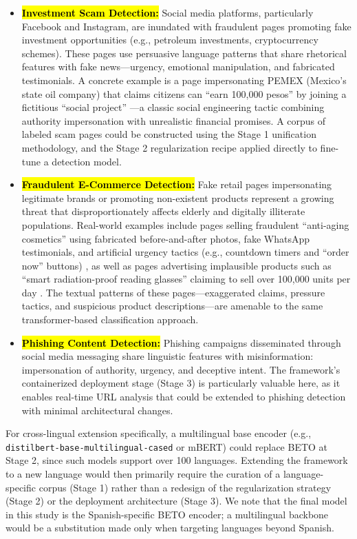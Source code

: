 \documentclass[informatics,article,accept,pdftex,moreauthors]{Definitions/mdpi}
\begin{document}
\begin{itemize}
    \item \textbf{\hl{Investment Scam Detection:}} Social media platforms, particularly Facebook and Instagram, are inundated with fraudulent pages promoting fake investment opportunities (e.g., petroleum investments, cryptocurrency schemes). These pages use persuasive language patterns that share rhetorical features with fake news—urgency, emotional manipulation, and fabricated testimonials. A concrete example is a page impersonating PEMEX (Mexico's state oil company) that claims citizens can ``earn 100,000 pesos'' by joining a fictitious ``social project'' \citep{scam2025investment}—a classic social engineering tactic combining authority impersonation with unrealistic financial promises. A corpus of labeled scam pages could be constructed using the Stage 1 unification methodology, and the Stage 2 regularization recipe applied directly to fine-tune a detection model.
    \item \textbf{\hl{Fraudulent E-Commerce Detection:}} Fake retail pages impersonating legitimate brands or promoting non-existent products represent a growing threat that disproportionately affects elderly and digitally illiterate populations. Real-world examples include pages selling fraudulent ``anti-aging cosmetics'' using fabricated before-and-after photos, fake WhatsApp testimonials, and artificial urgency tactics (e.g., countdown timers and ``order now'' buttons) \citep{scam2025cosmetics}, as well as pages advertising implausible products such as ``smart radiation-proof reading glasses'' claiming to sell over 100,000 units per day \citep{scam2025ecommerce}. The textual patterns of these pages—exaggerated claims, pressure tactics, and suspicious product descriptions—are amenable to the same transformer-based classification approach.
    \item \textbf{\hl{Phishing Content Detection:}} Phishing campaigns disseminated through social media messaging share linguistic features with misinformation: impersonation of authority, urgency, and deceptive intent. The framework's containerized deployment stage (Stage 3) is particularly valuable here, as it enables real-time URL analysis that could be extended to phishing detection with minimal architectural changes.
\end{itemize}

For cross-lingual extension specifically, a multilingual base encoder (e.g., \texttt{distilbert\allowbreak-base\allowbreak-multilingual\allowbreak-cased} or mBERT) could replace BETO at Stage 2, since such models support over 100 languages. Extending the framework to a new language would then primarily require the curation of a language-specific corpus (Stage 1) rather than a redesign of the regularization strategy (Stage 2) or the deployment architecture (Stage 3). We note that the final model in this study is the Spanish-specific BETO encoder; a multilingual backbone would be a substitution made only when targeting languages beyond Spanish.
\end{document}
